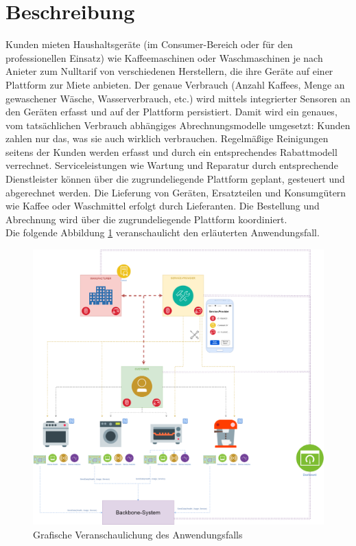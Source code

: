 \section{Beschreibung}
\label{sec:iot_usecase:description}
Kunden mieten Haushaltsgeräte (im Consumer-Bereich oder für den professionellen Einsatz) wie Kaffeemaschinen oder Waschmaschinen je nach Anieter zum Nulltarif von verschiedenen Herstellern, die ihre Geräte auf einer Plattform zur Miete anbieten. Der genaue Verbrauch (Anzahl Kaffees, Menge an gewaschener Wäsche, Wasserverbrauch, etc.) wird mittels integrierter Sensoren an den Geräten erfasst und auf der Plattform persistiert. Damit wird ein genaues, vom tatsächlichen Verbrauch abhängiges Abrechnungsmodelle umgesetzt: Kunden zahlen nur das, was sie auch wirklich verbrauchen. Regelmäßige Reinigungen seitens der Kunden werden erfasst und durch ein entsprechendes Rabattmodell verrechnet. Serviceleistungen wie Wartung und Reparatur durch entsprechende Dienstleister können über die zugrundeliegende Plattform geplant, gesteuert und abgerechnet werden. Die Lieferung von Geräten, Ersatzteilen und Konsumgütern wie Kaffee oder Waschmittel erfolgt durch Lieferanten. Die Bestellung und Abrechnung wird über die zugrundeliegende Plattform koordiniert.\\
Die folgende Abbildung \ref{fig:chapter04:usecase} veranschaulicht den erläuterten Anwendungsfall.

\begin{figure}[htbp]
 \centering
 \includegraphics[width=1.0\textwidth]{gfx/IOT-Anwendungsfall.png}
 \caption{Grafische Veranschaulichung des Anwendungsfalls}
 \label{fig:chapter04:usecase}
\end{figure}


